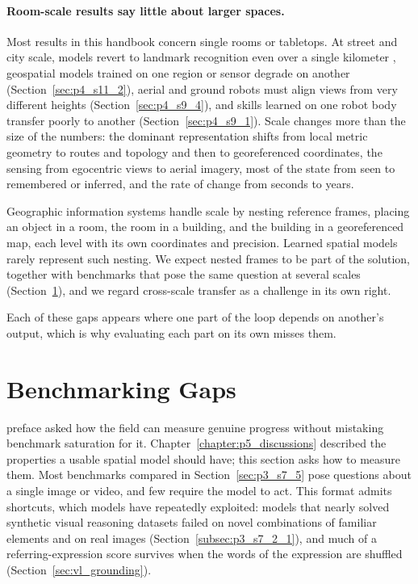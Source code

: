 \paragraph{Room-scale results say little about larger spaces.}
Most results in this handbook concern single rooms or tabletops.
At street and city scale, models revert to landmark recognition even over a single kilometer \cite{mahendran2026kilometervision}, geospatial models trained on one region or sensor degrade on another (Section~\ref{sec:p4_s11_2}), aerial and ground robots must align views from very different heights (Section~\ref{sec:p4_s9_4}), and skills learned on one robot body transfer poorly to another (Section~\ref{sec:p4_s9_1}).
Scale changes more than the size of the numbers: the dominant representation shifts from local metric geometry to routes and topology and then to georeferenced coordinates, the sensing from egocentric views to aerial imagery, most of the state from seen to remembered or inferred, and the rate of change from seconds to years.

Geographic information systems handle scale by nesting reference frames, placing an object in a room, the room in a building, and the building in a georeferenced map, each level with its own coordinates and precision.
Learned spatial models rarely represent such nesting.
We expect nested frames to be part of the solution, together with benchmarks that pose the same question at several scales (Section~\ref{sec:p5_benchmarks}), and we regard cross-scale transfer as a challenge in its own right.

Each of these gaps appears where one part of the loop depends on another's output, which is why evaluating each part on its own misses them.




\section{Benchmarking Gaps}
\label{sec:p5_benchmarks}

 preface asked how the field can measure genuine progress without mistaking benchmark saturation for it.
Chapter~\ref{chapter:p5_discussions} described the properties a usable spatial model should have; this section asks how to measure them.
Most benchmarks compared in Section~\ref{sec:p3_s7_5} pose questions about a single image or video, and few require the model to act.
This format admits shortcuts, which models have repeatedly exploited: models that nearly solved synthetic visual reasoning datasets failed on novel combinations of familiar elements and on real images (Section~\ref{subsec:p3_s7_2_1}), and much of a referring-expression score survives when the words of the expression are shuffled (Section~\ref{sec:vl_grounding}).

